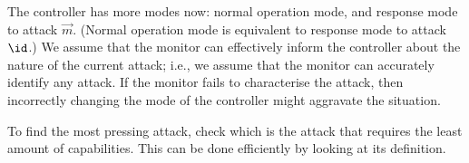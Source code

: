 {The controller has more modes now: normal operation mode, and response mode to attack $\vec{m}$. (Normal operation mode is equivalent to response mode to attack $\id$.) We assume that the monitor can effectively inform the controller about the nature of the current attack; i.e., we assume that the monitor can accurately identify any attack. If the monitor fails to characterise the attack, then incorrectly changing the mode of the controller might aggravate the situation. 
 
To find the most pressing attack, check which is the attack that requires the least amount of capabilities. This can be done efficiently by looking at its definition. 
 


}
